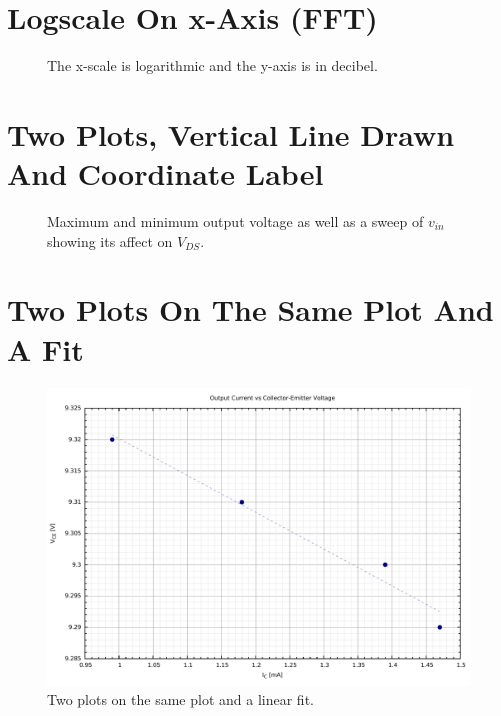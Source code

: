 \documentclass[10pt,a4paper,final]{report}
\begin{document}
\section{Logscale On x-Axis (FFT)}
\begin{figure}[!htbp]
\begin{center}
\resizebox{\columnwidth}{!}{}
\caption{The x-scale is logarithmic and the y-axis is in decibel.}
\label{fig:FFT}
\end{center}
\end{figure}


\section{Two Plots, Vertical Line Drawn And Coordinate Label}
\begin{figure}[!htbp]
\begin{center}
\resizebox{\columnwidth}{!}{}
\caption{Maximum and minimum output voltage as well as a sweep of $v_\mathit{in}$ showing its affect on $V_\mathit{DS}$.}
\label{fig:MaxMinVoltages}
\end{center}
\end{figure}


\section{Two Plots On The Same Plot And A Fit}
\begin{figure}[!hbtp]
\centering
\includegraphics[width=\textwidth]{../Code/OutputResistanceQ2/OutputResistanceQ2.pdf}
\caption{Two plots on the same plot and a linear fit.}
\end{figure}

\end{document}

